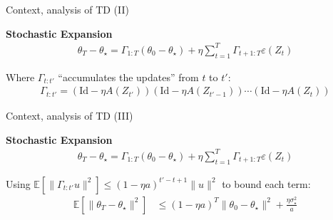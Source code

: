 \documentclass[aspectratio=169,14pt]{beamer}
\begin{document}
\begin{frame}[t]{Context, analysis of TD (II) }

  \textbf{Stochastic Expansion}
  \begin{align*}
    \theta_T - \theta_\star
    =
    \Gamma_{1:T} (\theta_0 - \theta_\star) + \eta \sum_{t=1}^T \Gamma_{t+1:T} \varepsilon(Z_t)
  \end{align*}

  Where $\Gamma_{t:t'}$ ``accumulates the updates'' from $t$ to $t'$:
  \begin{align*}
    \Gamma_{t:t'} = (\text{Id} - \eta A(Z_{t'})) (\text{Id} - \eta A(Z_{t'-1})) \cdots (\text{Id} - \eta A(Z_t))
  \end{align*}

  \vspace{1em}


\end{frame}



\begin{frame}[t]{Context, analysis of TD (III) }

  \textbf{Stochastic Expansion}
  \begin{align*}
    \theta_T - \theta_\star
    =
    \Gamma_{1:T} (\theta_0 - \theta_\star) + \eta \sum_{t=1}^T \Gamma_{t+1:T} \varepsilon(Z_t)
  \end{align*}

  \vspace{-0.5em}

  Using $\mathbb{E}[ \| \Gamma_{t:t'} u  \|^2 ] \le (1 - \eta a)^{t' - t + 1} \| u \|^2$ to bound each term:
  \begin{align*}
    \mathbb{E} [ \| \theta_T - \theta_\star \|^2 ]
    & \le
      (1 - \eta a)^T \| \theta_0 - \theta_\star \|^2
      + \frac{\eta \sigma_\star^2}{a}
  \end{align*}

  \vspace{0.5em}
  
\end{frame}
\end{document}
